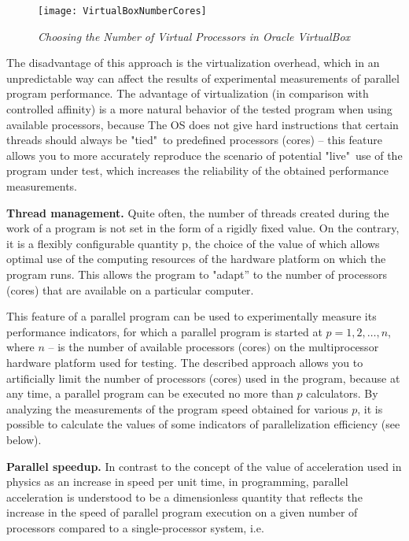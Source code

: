 {	\begin{figure}[H]
		\texttt{[image: VirtualBoxNumberCores]}
		\caption{\textit{Choosing the Number of Virtual Processors in Oracle VirtualBox}}
		\label{VirtualBoxNumberCores:image}
	\end{figure}
	\par The disadvantage of this approach is the virtualization overhead, which in an unpredictable way can affect the results of experimental measurements of parallel program performance. The advantage of virtualization (in comparison with controlled affinity) is a more natural behavior of the tested program when using available processors, because The OS does not give hard instructions that certain threads should always be "tied"\ to predefined processors (cores) – this feature allows you to more accurately reproduce the scenario of potential "live"\ use of the program under test, which increases the reliability of the obtained performance measurements.
	\par\textbf{Thread management.} Quite often, the number of threads created during the work of a program is not set in the form of a rigidly fixed value. On the contrary, it is a flexibly configurable quantity p, the choice of the value of which allows optimal use of the computing resources of the hardware platform on which the program runs. This allows the program to "adapt'' to the number of processors (cores) that are available on a particular computer.
	\par This feature of a parallel program can be used to experimentally measure its performance indicators, for which a parallel program is started at $p = 1,2,…,n$, where $n$ –  is the number of available processors (cores) on the multiprocessor hardware platform used for testing. The described approach allows you to artificially limit the number of processors (cores) used in the program, because at any time, a parallel program can be executed no more than $p$ calculators. By analyzing the measurements of the program speed obtained for various $p$, it is possible to calculate the values of some indicators of parallelization efficiency (see below).
	\par\textbf{Parallel speedup.} In contrast to the concept of the value of acceleration used in physics as an increase in speed per unit time, in programming, parallel acceleration is understood to be a dimensionless quantity that reflects the increase in the speed of parallel program execution on a given number of processors compared to a single-processor system, i.e.
}
